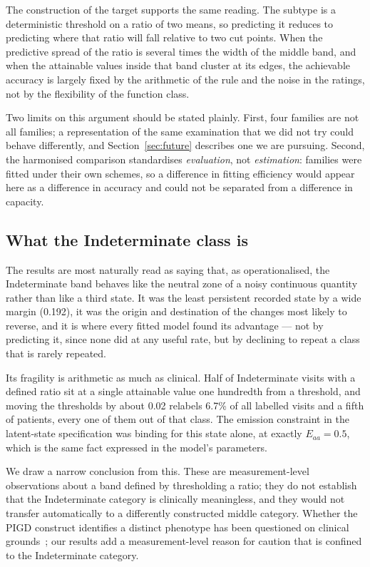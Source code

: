 \documentclass[11pt]{article}
\begin{document}
The construction of the target supports the same reading. The subtype is a
deterministic threshold on a ratio of two means, so predicting it reduces to
predicting where that ratio will fall relative to two cut points. When the
predictive spread of the ratio is several times the width of the middle band,
and when the attainable values inside that band cluster at its edges, the
achievable accuracy is largely fixed by the arithmetic of the rule and the noise
in the ratings, not by the flexibility of the function class.

Two limits on this argument should be stated plainly. First, four families are
not all families; a representation of the same examination that we did not try
could behave differently, and Section~\ref{sec:future} describes one we are
pursuing. Second, the harmonised comparison standardises \emph{evaluation}, not
\emph{estimation}: families were fitted under their own schemes, so a difference
in fitting efficiency would appear here as a difference in accuracy and could not
be separated from a difference in capacity.

\subsection{What the Indeterminate class is}
The results are most naturally read as saying that, as operationalised, the
Indeterminate band behaves like the neutral zone of a noisy continuous quantity
rather than like a third state. It was the least persistent recorded state by a
wide margin (0.192), it was the origin and destination of the changes most
likely to reverse, and it is where every fitted model found its advantage --- not
by predicting it, since none did at any useful rate, but by declining to repeat
a class that is rarely repeated.

Its fragility is arithmetic as much as clinical. Half of Indeterminate visits
with a defined ratio sit at a single attainable value one hundredth from a
threshold, and moving the thresholds by about 0.02 relabels 6.7\% of all
labelled visits and a fifth of patients, every one of them out of that class.
The emission constraint in the latent-state specification was binding for this
state alone, at exactly $E_{aa} = 0.5$, which is the same fact expressed in the
model's parameters.

We draw a narrow conclusion from this. These are measurement-level observations
about a band defined by thresholding a ratio; they do not establish that the
Indeterminate category is clinically meaningless, and they would not transfer
automatically to a differently constructed middle category. Whether the PIGD
construct identifies a distinct phenotype has been questioned on clinical
grounds~\citep{nutt2016,urso2022}; our results add a measurement-level reason
for caution that is confined to the Indeterminate category.
\end{document}
